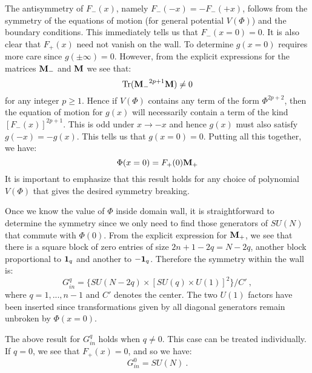 \documentclass[a4paper,prd,nofootinbib,twocolumn,showpacs]{revtex4}
\begin{document}
The antisymmetry of $F_-(x)$, namely $F_- (-x) = - F_- (+x)$,
follows from the symmetry of the equations of motion (for
general potential $V(\Phi )$) and the boundary conditions.
This immediately tells us that $F_- (x=0) = 0$. It is also
clear that $F_+ (x)$ need not vanish on the wall. To determine
$g(x=0)$ requires more care since $g(\pm \infty) =0$.
However, from the explicit expressions for the matrices
${\bf M}_-$ and ${\bf M}$ we see that:
\begin{equation}
{\rm Tr}( {\bf M_-}^{2p+1} {\bf M} ) \ne 0
\label{M+M}
\end{equation}
for any integer $p \ge 1$. Hence if $V(\Phi )$ contains 
any term of the form $\Phi^{2p+2}$, then the equation of
motion for $g(x)$ will necessarily contain a term of the
kind $[F_-(x)]^{2p+1}$. This is odd under $x \rightarrow -x$
and hence $g(x)$ must also satisfy $g(-x) = -g(x)$. This
tells us that $g(x=0) =0$. Putting all this together, we
have:
\begin{equation}
\Phi (x=0) = F_+ (0) {\bf M}_+
\label{Phiatx=0}
\end{equation}
It is important to emphasize that this result holds for 
any choice of polynomial $V(\Phi )$ that gives the desired 
symmetry breaking.

Once we know the value of $\Phi$ inside domain wall, it is
straightforward to determine the symmetry since we only need
to find those generators of $SU(N)$ that commute with
$\Phi (0)$. From the explicit expression for ${\bf M}_+$,
we see that there is a square block of zero entries of
size $2n+1-2q = N-2q$, another block proportional to
${\bf 1}_q$ and another to $-{\bf 1}_q$. Therefore
the symmetry within the wall is:
\begin{equation}
G_{in}^q = \{ SU(N-2q)\times [SU(q)\times U(1)]^2 \} /C' \ , 
\label{Ginside}
\end{equation}
where $q = 1,...,n-1$ and
$C'$ denotes the center. The two $U(1)$ factors
have been inserted since transformations given by all 
diagonal generators remain unbroken by $\Phi (x=0)$.

The above result for $G_{in}^q$ holds when $q\ne 0$.
This case can be treated individually.
If $q =0$, we see that $F_+ (x) =0$, and so we have:
\begin{equation}
G_{in}^0 = SU(N) \ .
\label{Ginside0}
\end{equation}
\end{document}
